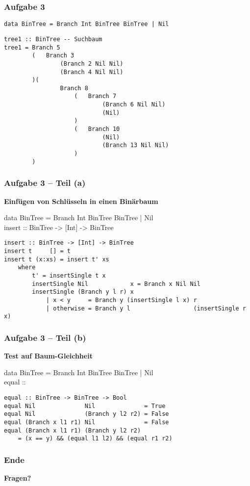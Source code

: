 \documentclass{beamer}
\begin{document}
\begin{frame}[t, fragile] \frametitle{Aufgabe 3}
	\begin{lstlisting}
data BinTree = Branch Int BinTree BinTree | Nil
	\end{lstlisting}
	\pause
	\begin{lstlisting}[firstnumber=2, basicstyle=\ttfamily\scriptsize]
tree1 :: BinTree -- Suchbaum  
tree1 = Branch 5 
		(   Branch 3 
				(Branch 2 Nil Nil) 
				(Branch 4 Nil Nil)
		)(
				Branch 8 
					(   Branch 7 
							(Branch 6 Nil Nil) 
							(Nil)
					)
					(   Branch 10 
							(Nil)
							(Branch 13 Nil Nil)
					)
		)
	\end{lstlisting}
\end{frame}

\begin{frame}[t, fragile] \frametitle{Aufgabe 3 -- Teil (a)}
	\textbf{Einfügen von Schlüsseln in einen Binärbaum}
	
	\begin{ttfamily}
		data BinTree = Branch Int BinTree BinTree | Nil \\
		insert :: BinTree -> [Int] -> BinTree
	\end{ttfamily}
	
	\bigskip \pause
	
	\begin{lstlisting}
insert :: BinTree -> [Int] -> BinTree
insert t     [] = t
insert t (x:xs) = insert t' xs
	where
		t' = insertSingle t x
		insertSingle Nil            x = Branch x Nil Nil
		insertSingle (Branch y l r) x
			| x < y     = Branch y (insertSingle l x) r
			| otherwise = Branch y l                  (insertSingle r x)
	\end{lstlisting}
\end{frame}

\begin{frame}[t, fragile] \frametitle{Aufgabe 3 -- Teil (b)}
	\textbf{Test auf Baum-Gleichheit}
	
	\begin{ttfamily}
		data BinTree = Branch Int BinTree BinTree | Nil \\
		equal :: \only<2>{BinTree -> BinTree -> Bool}
	\end{ttfamily}
	
	\bigskip \pause
	
	\begin{lstlisting}
equal :: BinTree -> BinTree -> Bool
equal Nil              Nil              = True
equal Nil              (Branch y l2 r2) = False
equal (Branch x l1 r1) Nil              = False
equal (Branch x l1 r1) (Branch y l2 r2)
	= (x == y) && (equal l1 l2) && (equal r1 r2)
	\end{lstlisting}
\end{frame}

\begin{frame} \frametitle{Ende}
	\centering
	\textbf{Fragen?}
\end{frame}
\end{document}
